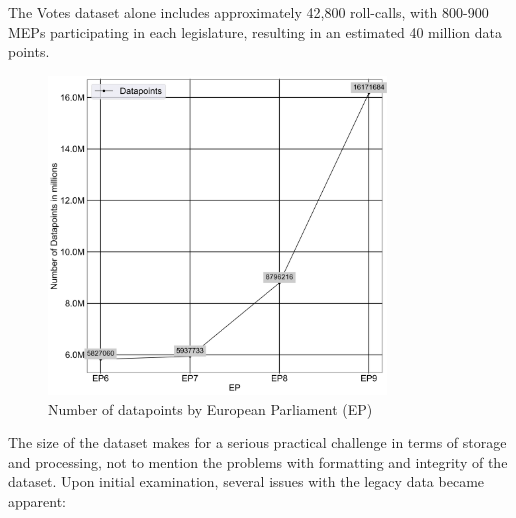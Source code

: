 \documentclass[a4paper,12pt]{report}
\begin{document}
    The Votes dataset alone includes approximately 42,800 roll-calls, with 800-900 MEPs participating in each
    legislature, resulting in an estimated 40 million data points.
    \begin{figure}[htb]
        \centering
        \includegraphics[width=0.8\textwidth]{Graphs/Datapoints}
        \caption{Number of datapoints by European Parliament (EP)}
        \label{fig:Datapoint graph}
    \end{figure}

    The size of the dataset makes for a serious practical challenge in terms of storage and processing, not to
    mention the problems with formatting and integrity of the dataset.
    Upon initial examination, several issues
    with the
    legacy data became apparent:
\end{document}
